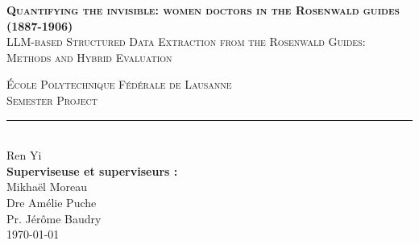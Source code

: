 \documentclass[11pt,titlepage]{report}
\begin{document}
\begin{titlepage}
    \centering
    \vspace*{\fill}
    
    \textbf{\textsc{\fontsize{25}{30}\selectfont Quantifying the invisible: women doctors in the Rosenwald guides (1887-1906)}}\\[0.8cm]
    
    \textsc{\Large LLM-based Structured Data Extraction from the Rosenwald Guides: Methods and Hybrid Evaluation}\\ 
    
    \vspace{\fill}	

    \textsc{\LARGE École Polytechnique Fédérale de Lausanne}\\[0.4cm]

    \textsc{\LARGE Semester Project}\\[0.4cm]
    \rule{\linewidth}{0.2 mm} \\[0.5 cm]
    
    {\Large Ren Yi} \\[1cm] 
    
    \textbf{Superviseuse et superviseurs :}\\
    Mikhaël Moreau\\
    Dre Amélie Puche\\
    Pr. Jérôme Baudry\\[1cm]
    
    \today
    
\end{titlepage}
\restoregeometry
\end{document}
